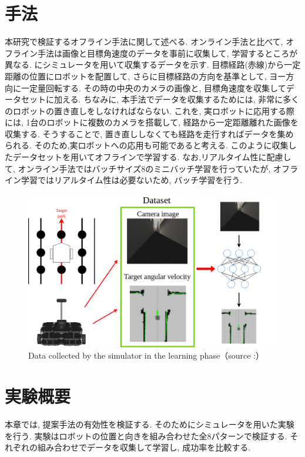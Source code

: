 
\section{手法}
本研究で検証するオフライン手法に関して述べる. オンライン手法と比べて, オフライン手法は画像と目標角速度のデータを事前に収集して, 学習するところが異なる. にシミュレータを用いて収集するデータを示す. 目標経路(赤線)から一定距離の位置にロボットを配置して, さらに目標経路の方向を基準として, ヨー方向に一定量回転する. その時の中央のカメラの画像と, 目標角速度を収集してデータセットに加える. ちなみに, 本手法でデータを収集するためには, 非常に多くのロボットの置き直しをしなければならない. これを, 実ロボットに応用する際には, 1台のロボットに複数のカメラを搭載して, 経路から一定距離離れた画像を収集する. そうすることで, 置き直ししなくても経路を走行すればデータを集められる. そのため,実ロボットへの応用も可能であると考える. このように収集したデータセットを用いてオフラインで学習する. なお,リアルタイム性に配慮して, オンライン手法ではバッチサイズ8のミニバッチ学習を行っていたが, オフライン学習ではリアルタイム性は必要ないため, バッチ学習を行う. 

\newpage
  \begin{figure}[h]
  \centering
  \includegraphics[keepaspectratio, scale=0.3]{images/offline.png}
  \caption{Data collected by the simulator in the learning phase（source :\cite{offline}）}
  \label{Fig:collect-data2}
  \end{figure}

\section{実験概要}
本章では, 提案手法の有効性を検証する. そのためにシミュレータを用いた実験を行う. 実験はロボットの位置と向きを組み合わせた全8パターンで検証する. それぞれの組み合わせでデータを収集して学習し, 成功率を比較する. 

